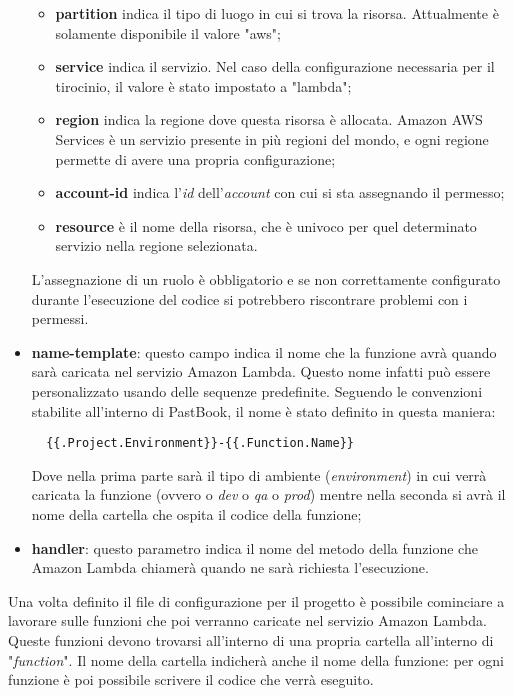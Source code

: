 \begin{itemize}
\begin{itemize}
    \item \textbf{partition} indica il tipo di luogo in cui si trova la risorsa.
Attualmente è solamente disponibile il valore "aws";

    \item \textbf{service} indica il servizio. Nel caso della configurazione
necessaria per il tirocinio, il valore è stato impostato a "lambda";

    \item \textbf{region} indica la regione dove questa risorsa è allocata.
Amazon AWS Services è un servizio presente in più regioni del mondo, e ogni
regione permette di avere una propria configurazione;

    \item \textbf{account-id} indica l'\textit{id} dell'\textit{account} con cui
si sta assegnando il permesso;

    \item \textbf{resource} è il nome della risorsa, che è univoco per quel
determinato servizio nella regione selezionata.
  \end{itemize}
  L'assegnazione di un ruolo è obbligatorio e se non correttamente configurato
durante l'esecuzione del codice si potrebbero riscontrare problemi con i
permessi.

  \item \textbf{name-template}: questo campo indica il nome che la funzione
avrà quando sarà caricata nel servizio Amazon Lambda. Questo nome infatti può
essere personalizzato usando delle sequenze predefinite. Seguendo le
convenzioni stabilite all'interno di PastBook, il nome è stato definito in
questa maniera:
\begin{verbatim}
  {{.Project.Environment}}-{{.Function.Name}}
\end{verbatim}
Dove nella prima parte sarà il tipo di ambiente (\textit{environment}) in cui
verrà caricata la funzione (ovvero o \textit{dev} o \textit{qa} o
\textit{prod}) mentre nella seconda si avrà il nome della cartella che ospita
il codice della funzione;

  \item \textbf{handler}: questo parametro indica il nome del metodo della
funzione che Amazon Lambda chiamerà quando ne sarà richiesta l'esecuzione.
\end{itemize}


Una volta definito il file di configurazione per il progetto è possibile
cominciare a lavorare sulle funzioni che poi verranno caricate nel servizio
Amazon Lambda. Queste funzioni devono trovarsi all'interno di una propria
cartella all'interno di "\textit{function}". Il nome della cartella indicherà
anche il nome della funzione: per ogni funzione è poi possibile scrivere il
codice che verrà eseguito.

